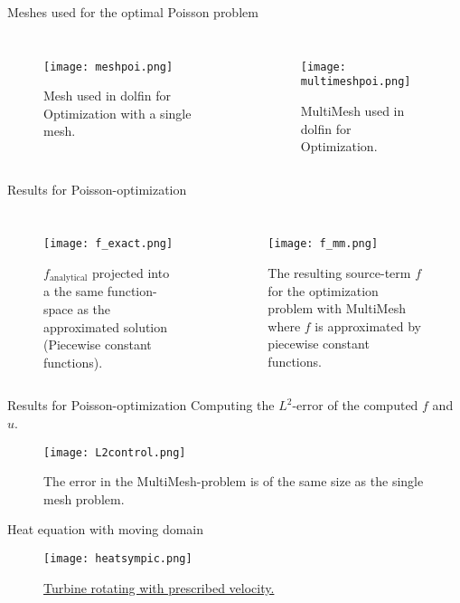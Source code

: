 \documentclass[mathserif]{beamer}
\begin{document}
\begin{frame}{Meshes used for the optimal Poisson problem}
  \begin{columns}
    \begin{figure}
      \texttt{[image: meshpoi.png]}
      \caption{Mesh used in dolfin for Optimization with a single mesh.}
    \end{figure}
    \begin{figure}
      \texttt{[image: multimeshpoi.png]}
      \caption{MultiMesh used in dolfin for Optimization.}
    \end{figure}
  \end{columns}
\end{frame}

\begin{frame}{Results for Poisson-optimization}
  \begin{columns}
    \begin{figure}
      \centering
      \texttt{[image: f\_exact.png]}
      \caption{$f_{\text{analytical}}$ projected into a the same function-space as
        the approximated solution (Piecewise constant functions).}
    \end{figure}
    \begin{figure}
      \centering
      \texttt{[image: f\_mm.png]}
      \caption{The resulting source-term $f$ for the optimization problem with MultiMesh where $f$ is approximated by piecewise constant functions.}
    \end{figure}
  \end{columns}
\end{frame}


\begin{frame}{Results for Poisson-optimization}
  Computing the $L^2$-error of the computed $f$ and $u$.
  \begin{figure}
    \centering
    \texttt{[image: L2control.png]}
    \caption{The error in the MultiMesh-problem is of the same size as the single mesh problem.}
  \end{figure}
\end{frame}

\begin{frame}{Heat equation with moving domain}
  \begin{figure}
    \texttt{[image: heatsympic.png]}
    \caption{\href{./heatsym.avi}{Turbine rotating with prescribed velocity.}}
  \end{figure}
\end{frame}
\end{document}
